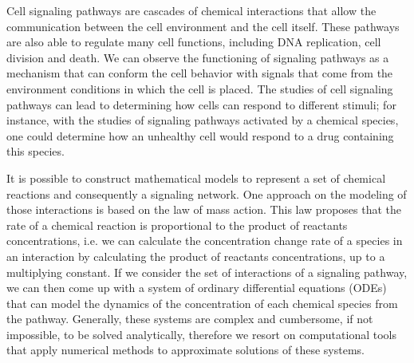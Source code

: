 




Cell signaling pathways are cascades of chemical interactions that 
allow the communication between the cell environment and the 
cell itself. These pathways are also able to regulate many cell 
functions, including DNA replication, cell division and death. We
can observe the functioning of signaling pathways as a mechanism that 
can conform the cell behavior with signals that come from the 
environment conditions in which the cell is placed. The studies of cell 
signaling pathways can lead to determining how cells can respond to 
different stimuli; for instance, with the studies of signaling pathways
activated by a chemical species, one could determine how an unhealthy 
cell would respond to a drug containing this species.

It is possible to construct mathematical models to represent a set of
chemical reactions and consequently a signaling network. One approach on 
the modeling of those interactions is based on the law of mass action. 
This law proposes that the rate of a chemical reaction is proportional 
to the product of reactants concentrations, i.e. we can calculate the 
concentration change rate of a species in an interaction by calculating 
the product of reactants concentrations, up to a multiplying constant. 
If we consider the set of interactions of a signaling pathway, we can
then come up with a system of ordinary differential equations (ODEs) 
that can model the dynamics of the concentration of each chemical 
species from the pathway. Generally, these systems are complex and 
cumbersome, if not impossible, to be solved analytically, therefore we 
resort on computational tools that apply numerical methods to 
approximate solutions of these systems.

